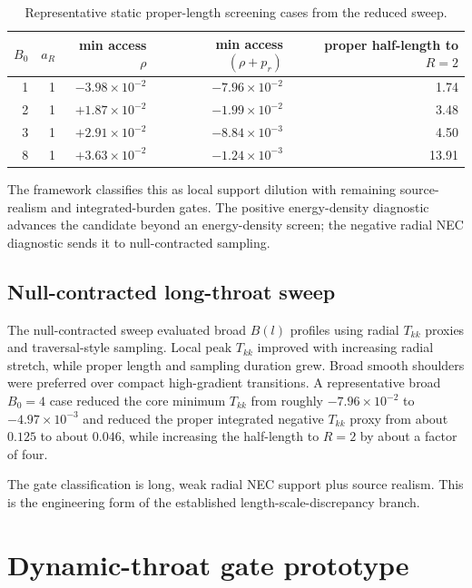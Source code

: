 \documentclass[11pt]{article}
\begin{document}
\begin{table}[ht]
\centering
\caption{Representative static proper-length screening cases from the reduced sweep.}
\label{tab:proper_length}
\begin{tabular}{rrrrr}
\toprule
$B_0$ & $a_R$ & min access $\rho$ & min access $(\rho+p_r)$ & proper half-length to $R=2$ \\
\midrule
1 & 1 & $-3.98\times10^{-2}$ & $-7.96\times10^{-2}$ & 1.74 \\
2 & 1 & $+1.87\times10^{-2}$ & $-1.99\times10^{-2}$ & 3.48 \\
3 & 1 & $+2.91\times10^{-2}$ & $-8.84\times10^{-3}$ & 4.50 \\
8 & 1 & $+3.63\times10^{-2}$ & $-1.24\times10^{-3}$ & 13.91 \\
\bottomrule
\end{tabular}
\end{table}

The framework classifies this as local support dilution with remaining source-realism and integrated-burden gates.  The positive energy-density diagnostic advances the candidate beyond an energy-density screen; the negative radial NEC diagnostic sends it to null-contracted sampling.

\subsection{Null-contracted long-throat sweep}

The null-contracted sweep evaluated broad $B(l)$ profiles using radial $T_{kk}$ proxies and traversal-style sampling.  Local peak $T_{kk}$ improved with increasing radial stretch, while proper length and sampling duration grew.  Broad smooth shoulders were preferred over compact high-gradient transitions.  A representative broad $B_0=4$ case reduced the core minimum $T_{kk}$ from roughly $-7.96\times10^{-2}$ to $-4.97\times10^{-3}$ and reduced the proper integrated negative $T_{kk}$ proxy from about $0.125$ to about $0.046$, while increasing the half-length to $R=2$ by about a factor of four.

The gate classification is long, weak radial NEC support plus source realism.  This is the engineering form of the established length-scale-discrepancy branch.

\section{Dynamic-throat gate prototype}
\label{sec:dynamic}
\end{document}
